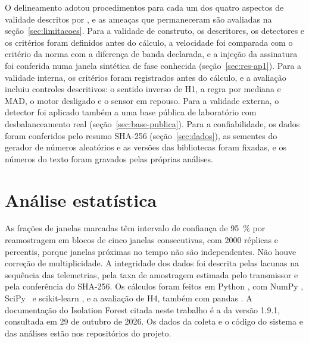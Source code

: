 O delineamento adotou procedimentos para cada um dos quatro aspectos de validade descritos por , e as ameaças que permaneceram são avaliadas na seção~\ref{sec:limitacoes}. Para a validade de construto, os descritores, os detectores e os critérios foram definidos antes do cálculo, a velocidade foi comparada com o critério da norma com a diferença de banda declarada, e a injeção da assinatura foi conferida numa janela sintética de fase conhecida (seção~\ref{sec:res-ap1}). Para a validade interna, os critérios foram registrados antes do cálculo, e a avaliação incluiu controles descritivos: o sentido inverso de H1, a regra por mediana e MAD, o motor desligado e o sensor em repouso. Para a validade externa, o detector foi aplicado também a uma base pública de laboratório com desbalanceamento real (seção~\ref{sec:base-publica}). Para a confiabilidade, os dados foram conferidos pelo resumo SHA-256 (seção~\ref{sec:dados}), as sementes do gerador de números aleatórios e as versões das bibliotecas foram fixadas, e os números do texto foram gravados pelas próprias análises.

\section{Análise estatística}\label{sec:analise}

As frações de janelas marcadas têm intervalo de confiança de \SI{95}{\percent} por reamostragem em blocos de cinco janelas consecutivas, com \num{2000} réplicas e percentis, porque janelas próximas no tempo não são independentes. Não houve correção de multiplicidade. A integridade dos dados foi descrita pelas lacunas na sequência das telemetrias, pela taxa de amostragem estimada pelo transmissor e pela conferência do SHA-256. Os cálculos foram feitos em Python \ambPython, com NumPy \ambNumpy, SciPy \ambScipy\ e scikit-learn \ambSklearn, e a avaliação de H4, também com pandas \ambPandas. A documentação do Isolation Forest citada neste trabalho \cite{scikitlearn2026} é a da versão 1.9.1, consultada em 29 de outubro de 2026. Os dados da coleta e o código do sistema e das análises estão nos repositórios do projeto.

